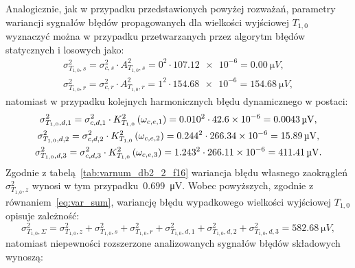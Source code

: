 Analogicznie, jak w przypadku przedstawionych powyżej rozważań, parametry wariancji sygnałów błędów propagowanych dla wielkości wyjściowej $T_{1,0}$ wyznaczyć można w przypadku przetwarzanych przez algorytm błędów statycznych i losowych jako:
\begin{gather}
\sigma_{T_{1,0},s}^{2} = \sigma_{c,s}^{2} \cdot A_{T_{1,0},s}^{2} = 0^{2} \cdot \num{107.12e-6} = \qty{0.00}{\micro V} \label{eq:sym_partd_output_var_stat_T_1_0}, \\
\sigma_{T_{1,0},r}^{2} = \sigma_{c,r}^{2} \cdot A_{T_{1,0},r}^{2} = 1^{2} \cdot \num{154.68e-6} = \qty{154.68}{\micro V} \label{eq:sym_partd_output_var_rand_T_1_0},
\end{gather}
natomiast w przypadku kolejnych harmonicznych błędu dynamicznego w postaci:
\begin{gather}
\sigma_{T_{1,0},d,1}^{2} = \sigma_{c,d,1}^{2} \cdot K_{T_{1,0}}^{2} \left(\omega_{c,e,1}\right) = {0.010}^{2} \cdot \num{42.6e-6} = \qty{0.0043}{\micro V} \label{eq:sym_partd_output_var_dyn_1_T_1_0}, \\
\sigma_{T_{1,0},d,2}^{2} = \sigma_{c,d,2}^{2} \cdot K_{T_{1,0}}^{2} \left(\omega_{c,e,2}\right) = {0.244}^{2} \cdot \num{266.34e-6} = \qty{15.89}{\micro V} \label{eq:sym_partd_output_var_dyn_2_T_1_0}, \\
\sigma_{T_{1,0},d,3}^{2} = \sigma_{c,d,3}^{2} \cdot K_{T_{1,0}}^{2} \left(\omega_{c,e,3}\right) = {1.243}^{2} \cdot \num{266.11e-6} = \qty{411.41}{\micro V} \label{eq:sym_partd_output_var_dyn_3_T_1_0}.
\end{gather}
Zgodnie z tabelą~\ref{tab:varnum_db2_2_f16} wariancja błędu własnego zaokrągleń $\sigma_{T_{1,0},z}^{2}$ wynosi w tym przypadku~\qty{0.699}{\micro V}. Wobec powyższych, zgodnie z równaniem~\eqref{eq:var_sum}, wariancję błędu wypadkowego wielkości wyjściowej $T_{1,0}$ opisuje zależność:
\begin{equation}
\sigma_{T_{1,0},\Sigma}^{2} = \sigma_{T_{1,0},z}^{2} + \sigma_{T_{1,0},s}^{2} + \sigma_{T_{1,0},r}^{2} + \sigma_{T_{1,0},d,1}^{2} + \sigma_{T_{1,0},d,2}^{2} + \sigma_{T_{1,0},d,3}^{2} = \qty{582.68}{\micro V} \label{eq:sym_partd_output_var_sum_T_1_0},
\end{equation}
natomiast niepewności rozszerzone analizowanych sygnałów błędów składowych wynoszą:
